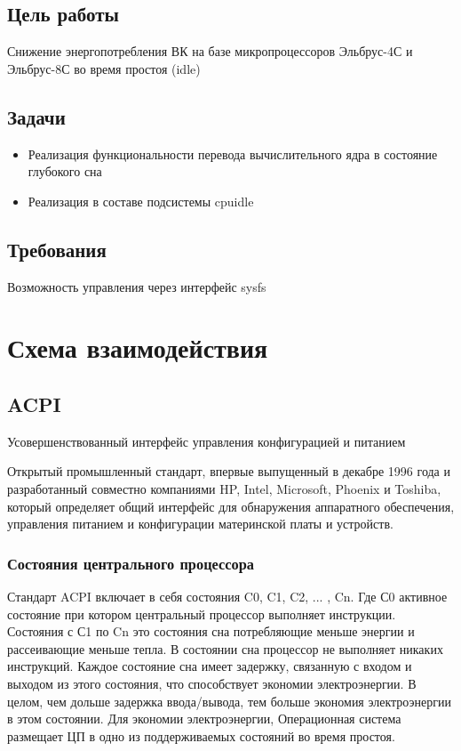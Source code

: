 \documentclass{article}
\begin{document}
\newpage
\subsection{Цель работы}
Снижение энергопотребления ВК на базе микропроцессоров Эльбрус-4С и Эльбрус-8С во время простоя (idle)
\subsection{Задачи}
\begin{itemize}
\item Реализация функциональности перевода вычислительного ядра в состояние глубокого сна
\item Реализация в составе подсистемы cpuidle
\end{itemize}
\subsection{Требования}
Возможность управления через интерфейс sysfs

\newpage
\section{Схема взаимодействия}

\subsection{ACPI}
Усовершенствованный интерфейс управления конфигурацией и питанием

Открытый промышленный стандарт, впервые выпущенный в декабре 1996 года и разработанный совместно компаниями HP, Intel, Microsoft, Phoenix и Toshiba, который определяет общий интерфейс для обнаружения аппаратного обеспечения, управления питанием и конфигурации материнской платы и устройств.

\subsubsection{Состояния центрального процессора}

Стандарт ACPI включает в себя состояния C0, C1, C2, ... , Cn. Где С0 активное состояние при котором центральный процессор выполняет инструкции. Состояния с С1 по Cn это состояния сна потребляющие меньше энергии и рассеивающие меньше тепла. В состоянии сна процессор не выполняет никаких инструкций. Каждое состояние сна имеет задержку, связанную с входом и выходом из этого состояния, что способствует экономии электроэнергии. В целом, чем дольше задержка ввода/вывода, тем больше экономия электроэнергии в этом состоянии. Для экономии электроэнергии, Операционная система размещает ЦП в одно из поддерживаемых состояний во время простоя.
\end{document}
